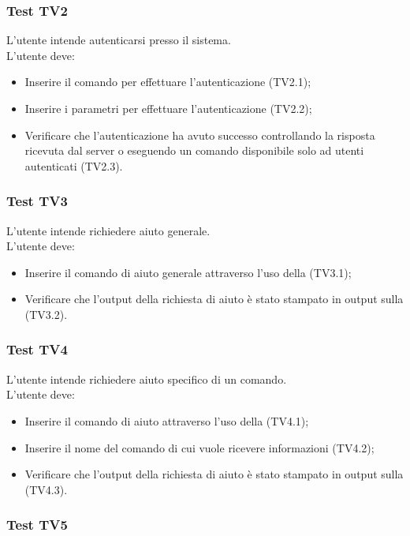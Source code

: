 \documentclass{scalatekids-article}
\begin{document}
\subsubsection{Test TV2}

L'utente intende autenticarsi presso il sistema.\\
L'utente deve:
\begin{itemize}
\item Inserire il comando per effettuare l'autenticazione (TV2.1);
\item Inserire i parametri per effettuare l'autenticazione (TV2.2);
\item Verificare che l'autenticazione ha avuto successo controllando la
  risposta ricevuta dal server o eseguendo un comando
  disponibile solo ad utenti autenticati (TV2.3).
\end{itemize}

\subsubsection{Test TV3}
\label{sec:TV3}

L'utente intende richiedere aiuto generale.\\
L'utente deve:
\begin{itemize}
\item Inserire il comando di aiuto generale attraverso l'uso della  (TV3.1);
\item Verificare che l'output della richiesta di aiuto è stato stampato in
  output sulla  (TV3.2).
\end{itemize}

\subsubsection{Test TV4}
\label{sec:TV4}

L'utente intende richiedere aiuto specifico di un comando.\\
L'utente deve:
\begin{itemize}
\item Inserire il comando di aiuto attraverso l'uso della  (TV4.1);
\item Inserire il nome del comando di cui vuole ricevere informazioni (TV4.2);
\item Verificare che l'output della richiesta di aiuto è stato stampato in
  output sulla  (TV4.3).
\end{itemize}

\subsubsection{Test TV5}
\end{document}
